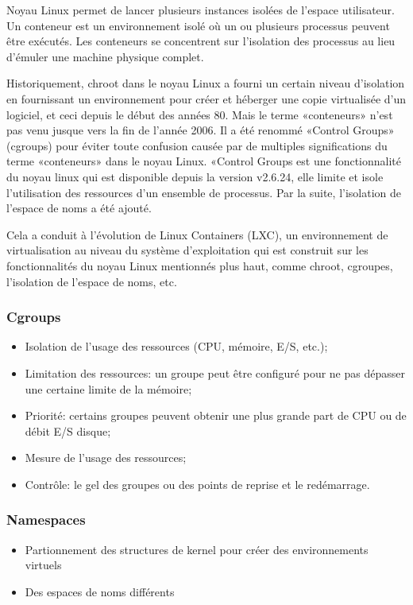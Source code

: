 \begin{onehalfspace}
Noyau Linux permet de lancer plusieurs instances isolées de l'espace utilisateur. Un conteneur est un environnement isolé où un ou plusieurs processus peuvent être exécutés. Les conteneurs se concentrent sur l'isolation des processus au lieu d'émuler une machine physique complet.

Historiquement, chroot dans le noyau Linux a fourni un certain niveau d'isolation en fournissant un environnement pour créer et héberger une copie virtualisée d'un logiciel, et ceci depuis le début des années 80. Mais le terme «conteneurs» n'est pas venu jusque vers la fin de l'année 2006. Il a été renommé «Control Groups» (cgroups) pour éviter toute confusion causée par de multiples significations du terme «conteneurs» dans le noyau Linux. «Control Groups est une fonctionnalité du noyau linux qui est disponible depuis la version v2.6.24, elle limite et isole l'utilisation des ressources d'un ensemble de processus. Par la suite, l'isolation de l'espace de noms a été ajouté.

Cela a conduit à l'évolution de Linux Containers (LXC), un environnement de virtualisation au niveau du système d'exploitation qui est construit sur les fonctionnalités du noyau Linux mentionnés plus haut, comme chroot, cgroupes, l'isolation de l'espace de noms, etc.

\subsubsection*{Cgroups}

\begin{itemize}
\item Isolation de l'usage des ressources (CPU, mémoire, E/S, etc.);
\item Limitation des ressources: un groupe peut être configuré pour ne pas dépasser une certaine limite de la mémoire;
\item Priorité: certains groupes peuvent obtenir une plus grande part de CPU ou de débit E/S disque;
\item Mesure de l'usage des ressources;
\item Contrôle: le gel des groupes ou des points de reprise et le redémarrage.
\end{itemize}

\subsubsection*{Namespaces}
\begin{itemize}
\item Partionnement des structures de kernel pour créer des environnements virtuels
\item Des espaces de noms différents


\end{itemize}
\end{onehalfspace}

